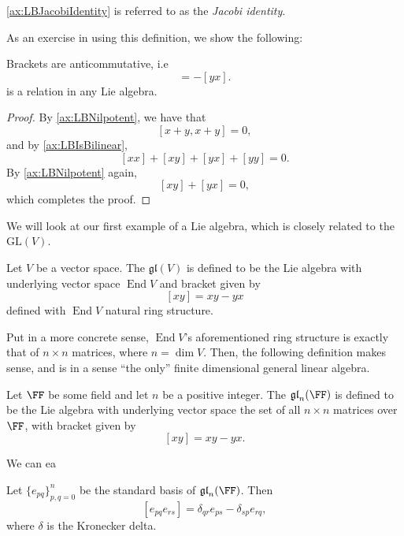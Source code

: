 \documentclass{article}
\newcommand{\lb}[1]{\ensuremath{\left[{#1}\right]}}
\DeclareMathOperator{\End}{End}
\newcommand{\GL}{\ensuremath{\text{GL}}}
\newcommand{\glalg}{\ensuremath{\mathfrak{gl}}}
\begin{document}
\ref{ax:LBJacobiIdentity} is referred to as the \textit{Jacobi identity}.

As an exercise in using this definition, we show the following:

\begin{proposition}
    Brackets are anticommutative, i.e
    \begin{equation}
        [xy]
        =
        -[yx].
        \tag{L2'}
    \end{equation}
    is a relation in any Lie algebra.
\end{proposition}
\begin{proof}
    By \ref{ax:LBNilpotent}, we have that
    \[
        \lb{x+y,x+y}
        =
        0,
    \]
    and by \ref{ax:LBIsBilinear},
    \[
        \lb{xx} + \lb{xy} + \lb{yx} + \lb{yy}
        =
        0.
    \]
    By \ref{ax:LBNilpotent} again,
    \[
        \lb{xy} + \lb{yx}
        =
        0,
    \]
    which completes the proof.
\end{proof}

We will look at our first example of a Lie algebra, which is closely related to the $\GL(V)$.

\begin{definition}[$\glalg$, abstractly]
    Let $V$ be a vector space.
    The  $\glalg(V)$ is defined to be the Lie algebra with underlying vector space $\End V$ and bracket given by
    \[
        \lb{xy}
        =
        xy - yx
    \]
    defined with $\End V$ natural ring structure.
\end{definition}

    Put in a more concrete sense, $\End V$'s aforementioned ring structure is exactly that of $n \times n$ matrices, where $n = \dim V$.
    Then, the following definition makes sense, and is in a sense ``the only'' finite dimensional general linear algebra.

\begin{definition}[$\glalg$, concretely]
    Let $\FF$ be some field and let $n$ be a positive integer.
    The  $\glalg_n(\FF)$ is defined to be the Lie algebra with underlying vector space the set of all $n \times n$ matrices over $\FF$, with bracket given by
    \[
        \lb{xy}
        =
        xy - yx.
    \]
\end{definition}

We can ea

\begin{proposition}
    Let $\{e_{pq}\}_{p,q = 0}^n$ be the standard basis of $\glalg_n(\FF)$.
    Then
    \[
        \lb{e_{pq}e_{rs}}
        =
        \delta_{qr}e_{ps}
        -
        \delta_{sp}e_{rq},
    \]
    where $\delta$ is the Kronecker delta.
\end{proposition}
\end{document}
